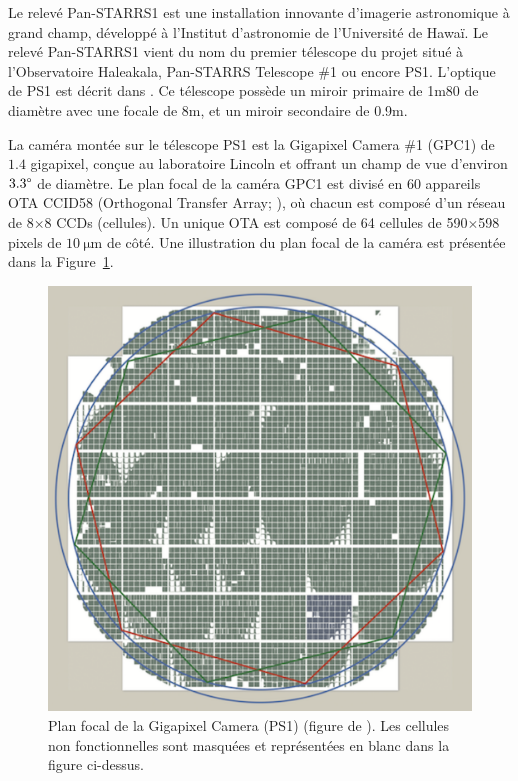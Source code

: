 \documentclass[../main/main.tex]{subfiles}
\begin{document}
Le relevé Pan-STARRS1 \citep{ChambersPS1survey} est une installation innovante d’imagerie
astronomique à grand champ,
développé à l'Institut d'astronomie de l'Université de Hawaï. Le relevé
Pan-STARRS1 vient du nom du premier télescope du projet situé à l'Observatoire Haleakala,
Pan-STARRS Telescope \#1 ou encore PS1. L'optique de PS1 est décrit dans
\citet{Hodapp2004a, Hodapp2004b, Hodapp2004c, Morgan2008}.
Ce télescope possède un miroir
primaire de 1m80 de diamètre avec une focale de 8m, et un miroir
secondaire de 0.9m. 

La caméra montée sur le télescope PS1 est la Gigapixel Camera \#1
(GPC1) de $1.4$ gigapixel, conçue au laboratoire Lincoln
\citep{Tonry2006GPC1,Tonry2008GPC1} et offrant un champ de vue d'environ
$3.3\degree$ de diamètre. 
Le plan focal de la caméra GPC1 est divisé en 60 appareils OTA CCID58
(Orthogonal Transfer Array; \citet{Tonry1997OTA,Tonry2008GPC1}), où
chacun est composé d'un réseau de 8$\times$8 CCDs (cellules). Un unique
OTA est composé de 64 cellules de 590$\times$598 pixels de
$\SI{10}{\micro\metre}$ de côté. Une illustration du plan focal de la
caméra est présentée dans la Figure~\ref{fig:gpc1focalplan}.

\begin{figure}[h]
  \begin{minipage}[c]{0.4\textwidth}
    \includegraphics[width=\textwidth]{../figures/05_sedfit/GPC1focalplan.png}
  \end{minipage}\hfill
  \begin{minipage}[c]{0.5\textwidth}
    \caption[Plan focal de la Gigapixel Camera (PS1)]{Plan focal de la
    Gigapixel Camera (PS1) (figure de \citet{ChambersPS1survey}). Les cellules non fonctionnelles sont
    masquées et représentées en blanc dans la figure ci-dessus.}\label{fig:gpc1focalplan}
  \end{minipage}
\end{figure}
\end{document}
